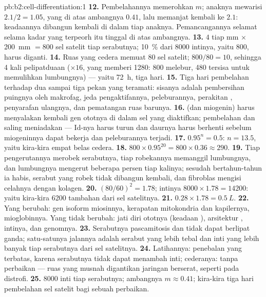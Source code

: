 \begin{solution}{pb:b2:cell-differentiation:1}
\textbf{12.} Pembelahannya memerohkan $m$; anaknya mewarisi $2.1/2 =
1.05$, yang di atas ambangnya $0.41$, lalu memanjat kembali ke $2.1$:
keadaannya dibangun kembali di dalam tiap anaknya. Pemancangannya
selamat selama kadar yang terpeorh itu tinggal di atas ambangnya.
\textbf{13.} $4$ tiap mm $\times$ \qty{200}{mm} $= 800$ sel satelit
tiap serabutnya; \qty{10}{\%} dari \num{8000} intinya, yaitu \num{800},
harus diganti.
\textbf{14.} Ruas yang cedera memuat $80$ sel satelit; $800/80 =
10$,
sehingga 4 kali pelipatduaan ($\times 16$, yang memberi \num{1280}: 800
melebur, 480 tersisa untuk memulihkan lumbungnya) --- yaitu
\qty{72}{h}, tiga hari.
\textbf{15.} Tiga hari pembelahan terhadap dua sampai tiga pekan yang
teramati: sisanya adalah pembersihan puingnya oleh makrofag, jeda
pengaktifannya, peleburannya, perakitan , penyarafan
ulangnya, dan pematangan ruas barunya.
\textbf{16.}  (dan miogenin) harus menyalakan kembali gen ototnya
di dalam sel yang diaktifkan; pembelahan dan  saling
meniadakan --- Id-nya harus turun dan daurnya harus berhenti sebelum
miogeninnya dapat bekerja dan peleburannya terjadi.
\textbf{17.} $0.95^{n} = 0.5$: $n = 13.5$, yaitu kira-kira empat belas
cedera.
\textbf{18.} $800\times 0.95^{20} = 800\times 0.36 \approx 290$.
\textbf{19.} Tiap pengerutannya merobek serabutnya, tiap robekannya
memanggil lumbungnya, dan lumbungnya mengerut beberapa persen tiap
kalinya; sesudah bertahun-tahun ia habis, serabut yang robek tidak
dibangun kembali, dan fibroblas mengisi celahnya dengan kolagen.
\textbf{20.} $(80/60)^{2} = 1.78$; intinya $8000\times 1.78 = \num{14200}$:
yaitu kira-kira \num{6200} tambahan dari sel satelitnya.
\textbf{21.} $0.28\times 1.78 = \qty{0.5}{L}$.
\textbf{22.} Yang berubah: gen isoform miosinnya, kerapatan mitokondria
dan kapilernya, mioglobinnya. Yang tidak berubah: jati diri ototnya
(keadaan ), arsitektur , intinya, dan genomnya.
\textbf{23.} Serabutnya pascamitosis dan tidak dapat berlipat ganda;
satu-satunya jalannya adalah serabut yang lebih tebal dan inti yang
lebih banyak tiap serabutnya dari sel satelitnya.
\textbf{24.} Latihannya: penebalan yang terbatas, karena serabutnya
tidak dapat menambah inti; cederanya: tanpa perbaikan --- ruas yang
musnah digantikan jaringan berserat, seperti pada distrofi.
\textbf{25.} \num{8000} inti tiap serabutnya; ambangnya $m \approx 0.41$;
kira-kira tiga hari pembelahan sel satelit bagi sebuah perbaikan.
\end{solution}
